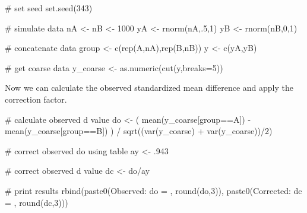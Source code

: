 \documentclass[
  letterpaper,
  DIV=11,
  numbers=noendperiod]{scrreprt}
\newenvironment{Shaded}{\begin{snugshade}}{\end{snugshade}}
\newcommand{\AttributeTok}[1]{\textcolor[rgb]{0.40,0.45,0.13}{#1}}
\newcommand{\CommentTok}[1]{\textcolor[rgb]{0.37,0.37,0.37}{#1}}
\newcommand{\DecValTok}[1]{\textcolor[rgb]{0.68,0.00,0.00}{#1}}
\newcommand{\FunctionTok}[1]{\textcolor[rgb]{0.28,0.35,0.67}{#1}}
\newcommand{\NormalTok}[1]{\textcolor[rgb]{0.00,0.23,0.31}{#1}}
\newcommand{\OtherTok}[1]{\textcolor[rgb]{0.00,0.23,0.31}{#1}}
\newcommand{\SpecialCharTok}[1]{\textcolor[rgb]{0.37,0.37,0.37}{#1}}
\newcommand{\StringTok}[1]{\textcolor[rgb]{0.13,0.47,0.30}{#1}}
\begin{document}
\begin{Shaded}
\begin{Highlighting}[]
\CommentTok{\# set seed}
\FunctionTok{set.seed}\NormalTok{(}\DecValTok{343}\NormalTok{)}

\CommentTok{\# simulate data}
\NormalTok{nA }\OtherTok{\textless{}{-}}\NormalTok{ nB }\OtherTok{\textless{}{-}} \DecValTok{1000}
\NormalTok{yA }\OtherTok{\textless{}{-}} \FunctionTok{rnorm}\NormalTok{(nA,.}\DecValTok{5}\NormalTok{,}\DecValTok{1}\NormalTok{)}
\NormalTok{yB }\OtherTok{\textless{}{-}} \FunctionTok{rnorm}\NormalTok{(nB,}\DecValTok{0}\NormalTok{,}\DecValTok{1}\NormalTok{)}

\CommentTok{\# concatenate data}
\NormalTok{group }\OtherTok{\textless{}{-}} \FunctionTok{c}\NormalTok{(}\FunctionTok{rep}\NormalTok{(}\StringTok{\textquotesingle{}A\textquotesingle{}}\NormalTok{,nA),}\FunctionTok{rep}\NormalTok{(}\StringTok{\textquotesingle{}B\textquotesingle{}}\NormalTok{,nB))}
\NormalTok{y }\OtherTok{\textless{}{-}} \FunctionTok{c}\NormalTok{(yA,yB)}

\CommentTok{\# get coarse data}
\NormalTok{y\_coarse }\OtherTok{\textless{}{-}} \FunctionTok{as.numeric}\NormalTok{(}\FunctionTok{cut}\NormalTok{(y,}\AttributeTok{breaks=}\DecValTok{5}\NormalTok{)) }
\end{Highlighting}
\end{Shaded}

Now we can calculate the observed standardized mean difference and apply
the correction factor.

\begin{Shaded}
\begin{Highlighting}[]
\CommentTok{\# calculate observed d value}
\NormalTok{do }\OtherTok{\textless{}{-}}\NormalTok{ ( }\FunctionTok{mean}\NormalTok{(y\_coarse[group}\SpecialCharTok{==}\StringTok{\textquotesingle{}A\textquotesingle{}}\NormalTok{]) }\SpecialCharTok{{-}} \FunctionTok{mean}\NormalTok{(y\_coarse[group}\SpecialCharTok{==}\StringTok{\textquotesingle{}B\textquotesingle{}}\NormalTok{]) ) }\SpecialCharTok{/} \FunctionTok{sqrt}\NormalTok{((}\FunctionTok{var}\NormalTok{(y\_coarse) }\SpecialCharTok{+} \FunctionTok{var}\NormalTok{(y\_coarse))}\SpecialCharTok{/}\DecValTok{2}\NormalTok{)}

\CommentTok{\# correct observed do using table}
\NormalTok{ay }\OtherTok{\textless{}{-}}\NormalTok{ .}\DecValTok{943}

\CommentTok{\# correct observed d value}
\NormalTok{dc }\OtherTok{\textless{}{-}}\NormalTok{ do}\SpecialCharTok{/}\NormalTok{ay}

\CommentTok{\# print results}
\FunctionTok{rbind}\NormalTok{(}\FunctionTok{paste0}\NormalTok{(}\StringTok{\textquotesingle{}Observed: do = \textquotesingle{}}\NormalTok{, }\FunctionTok{round}\NormalTok{(do,}\DecValTok{3}\NormalTok{)),}
      \FunctionTok{paste0}\NormalTok{(}\StringTok{\textquotesingle{}Corrected: dc = \textquotesingle{}}\NormalTok{, }\FunctionTok{round}\NormalTok{(dc,}\DecValTok{3}\NormalTok{)))}
\end{Highlighting}
\end{Shaded}
\end{document}
